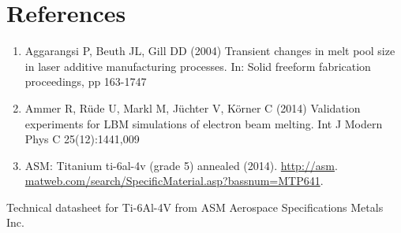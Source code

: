 \documentclass[10pt]{article}
\begin{document}
\section*{References}
\begin{enumerate}
  \item Aggarangsi P, Beuth JL, Gill DD (2004) Transient changes in melt pool size in laser additive manufacturing processes. In: Solid freeform fabrication proceedings, pp 163-1747

  \item Ammer R, Rüde U, Markl M, Jüchter V, Körner C (2014) Validation experiments for LBM simulations of electron beam melting. Int J Modern Phys C 25(12):1441,009

  \item ASM: Titanium ti-6al-4v (grade 5) annealed (2014). \href{http://asm}{http://asm}. \href{http://matweb.com/search/SpecificMaterial.asp?bassnum=MTP641}{matweb.com/search/SpecificMaterial.asp?bassnum=MTP641}.

\end{enumerate}

Technical datasheet for Ti-6Al-4V from ASM Aerospace Specifications Metals Inc.
\end{document}
